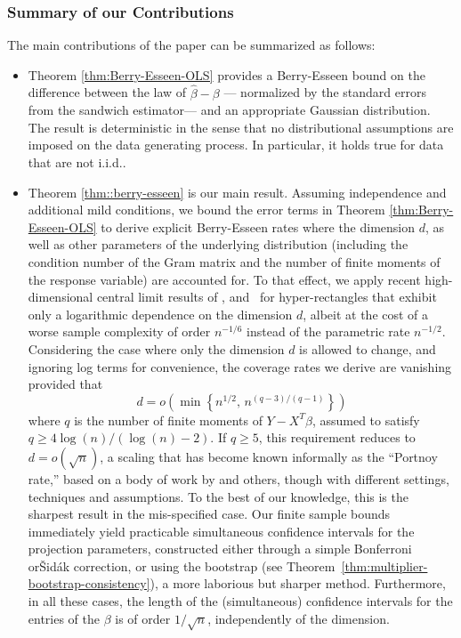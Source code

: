 \documentclass{article}
\let\hat\widehat
\begin{document}
\subsubsection*{Summary of our Contributions}
The main
contributions of the paper can be summarized as follows:
\begin{itemize}
\item Theorem \ref{thm:Berry-Esseen-OLS}
provides a Berry-Esseen bound
on the difference between
the law of $\hat\beta - \beta$ ---
normalized by the standard errors from the sandwich estimator---
and an appropriate Gaussian distribution.
The result is deterministic in the sense that
no distributional assumptions are imposed
on the data generating process. In particular, it holds true for data that are not i.i.d..
\item
Theorem \ref{thm::berry-esseen}
is our main result.
Assuming independence and additional mild conditions,
we bound the error terms in
Theorem \ref{thm:Berry-Esseen-OLS}
to derive explicit Berry-Esseen rates where the dimension $d$, as well as other parameters of the underlying distribution (including the condition number of the Gram matrix and the number of finite moments of the response variable) are accounted for.
To that effect, we apply recent high-dimensional central limit results of \cite{koike2019high}, and~\cite{Chern17} for hyper-rectangles that exhibit only a logarithmic dependence on the dimension $d$, albeit at the cost of a worse sample complexity of order
$n^{-1/6}$ instead of the parametric rate $n^{-1/2}$.
Considering
the case where only the dimension $d$ is allowed to change, and ignoring log terms for convenience, the coverage rates we derive are vanishing provided that
$$
d = o\left(\min\left\{n^{1/2},\, n^{(q-3)/(q-1)}\right\}\right)
$$
where $q$ is the number of
finite moments of
$Y-X^T\beta$, assumed to satisfy $q \geq 4 \log(n)/(\log(n) - 2)$.
If $q \ge 5$, this requirement reduces to $d = o(\sqrt{n})$, a scaling that has become
known informally as the ``Portnoy rate,'' based on a body of work by
\cite{Portnoy84,Portnoy85,Portnoy86,Portnoy88} and others, though with different settings, techniques
and assumptions.
To the best of our knowledge,
this is the sharpest result
in the mis-specified case. Our finite sample bounds immediately yield practicable simultaneous confidence intervals for the projection parameters, constructed either through a simple Bonferroni or{\v{S}}id{\'a}k correction, or using the bootstrap (see Theorem~\ref{thm:multiplier-bootstrap-consistency}), a more laborious but sharper method. Furthermore, in all these cases, the length of the (simultaneous) confidence intervals for the entries of the $\beta$ is of order $1/\sqrt{n}$, independently of the dimension.

\end{itemize}
\end{document}
